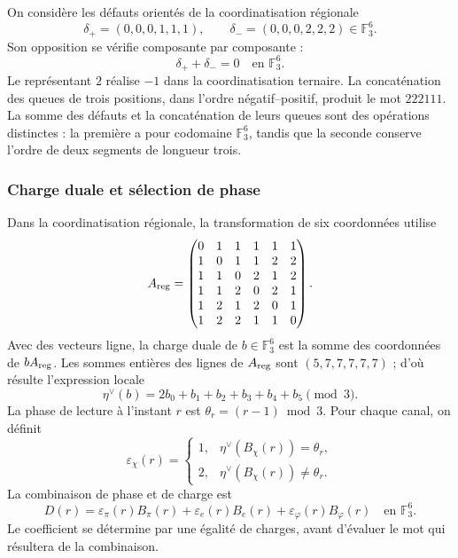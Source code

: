On considère les défauts orientés de la coordinatisation régionale
\[
 \delta_+=(0,0,0,1,1,1),\qquad
 \delta_-=(0,0,0,2,2,2)\in\mathbb F_3^6.
\]
Son opposition se vérifie composante par composante :
\[
 \delta_++\delta_-=0\quad\text{en }\mathbb F_3^6.
\]
Le représentant $2$ réalise $-1$ dans la coordinatisation ternaire. La concaténation
des queues de trois positions, dans l'ordre négatif--positif, produit
le mot $222111$. La somme des défauts et la concaténation de leurs
queues sont des opérations distinctes : la première a pour codomaine
$\mathbb F_3^6$, tandis que la seconde conserve l'ordre de deux
segments de longueur trois.

\subsubsection{Charge duale et sélection de phase}

Dans la coordinatisation régionale, la transformation de six coordonnées utilise
\[
 A_{\rm reg}=
 \begin{pmatrix}
 0&1&1&1&1&1\\
 1&0&1&1&2&2\\
 1&1&0&2&1&2\\
 1&1&2&0&2&1\\
 1&2&1&2&0&1\\
 1&2&2&1&1&0
 \end{pmatrix}.
\]
Avec des vecteurs ligne, la charge duale de $b\in\mathbb F_3^6$ est la somme
des coordonnées de $bA_{\rm reg}$. Les sommes entières des lignes de
$A_{\rm reg}$ sont $(5,7,7,7,7,7)$ ; d'où résulte l'expression locale
\begin{equation}
 \eta^\vee(b)=2b_0+b_1+b_2+b_3+b_4+b_5\pmod3.
 \label{act21:eq:kdes-cargadual}
\end{equation}
La phase de lecture à l'instant $r$ est
$\theta_r=(r-1)\bmod3$. Pour chaque canal, on définit
\[
 \varepsilon_\chi(r)=
 \begin{cases}
 1,&\eta^\vee(B_\chi(r))=\theta_r,\\
 2,&\eta^\vee(B_\chi(r))\ne\theta_r.
 \end{cases}
\]
La combinaison de phase et de charge est
\begin{equation}
 D(r)=\varepsilon_\pi(r)B_\pi(r)
      +\varepsilon_e(r)B_e(r)
      +\varepsilon_\varphi(r)B_\varphi(r)
      \quad\text{en }\mathbb F_3^6.
 \label{act21:eq:kdes-fasecarga}
\end{equation}
Le coefficient se détermine par une égalité de charges, avant d'évaluer le mot qui résultera de la combinaison.

